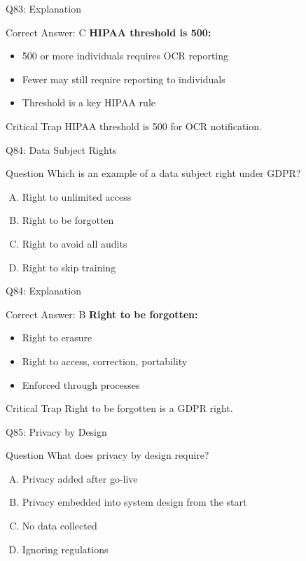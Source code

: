 \documentclass{beamer}
\begin{document}
	\begin{frame}{Q83: Explanation}
		\begin{block}{Correct Answer: C}
			\textbf{HIPAA threshold is 500:}
			\begin{itemize}
				\item 500 or more individuals requires OCR reporting
				\item Fewer may still require reporting to individuals
				\item Threshold is a key HIPAA rule
			\end{itemize}
		\end{block}
		\begin{alertblock}{Critical Trap}
			HIPAA threshold is 500 for OCR notification.
		\end{alertblock}
	\end{frame}
	
	\begin{frame}{Q84: Data Subject Rights}
		\begin{block}{Question}
			Which is an example of a data subject right under GDPR?
		\end{block}
		\begin{enumerate}[(A)]
			\item Right to unlimited access
			\item Right to be forgotten
			\item Right to avoid all audits
			\item Right to skip training
		\end{enumerate}
	\end{frame}
	
	\begin{frame}{Q84: Explanation}
		\begin{block}{Correct Answer: B}
			\textbf{Right to be forgotten:}
			\begin{itemize}
				\item Right to erasure
				\item Right to access, correction, portability
				\item Enforced through processes
			\end{itemize}
		\end{block}
		\begin{alertblock}{Critical Trap}
			Right to be forgotten is a GDPR right.
		\end{alertblock}
	\end{frame}
	
	\begin{frame}{Q85: Privacy by Design}
		\begin{block}{Question}
			What does privacy by design require?
		\end{block}
		\begin{enumerate}[(A)]
			\item Privacy added after go-live
			\item Privacy embedded into system design from the start
			\item No data collected
			\item Ignoring regulations
		\end{enumerate}
	\end{frame}
	
\end{document}
